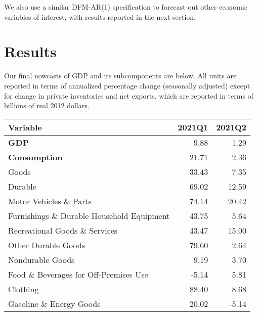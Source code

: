 \documentclass[11pt, letterpaper]{article}\usepackage[]{graphicx}\usepackage[]{color}
\begin{document}
We also use a similar DFM-AR(1) specification to forecast out other economic variables of interest, with results reported in the next section.


\section{Results}
Our final nowcasts of GDP and its subcomponents are below. All units are reported in terms of annualized percentage change (seasonally adjusted) except for change in private inventories and net exports, which are reported in terms of billions of real 2012 dollars.
\begin{table}[H]
\centering
\begingroup\fontsize{10pt}{12pt}\selectfont
\begin{tabular}{lrr}
  \hline
Variable & 2021Q1 & 2021Q2 \\ 
  \hline
\hspace{0mm} \textbf{GDP} & 9.88 & 1.29 \\ 
  \hspace{0mm} \textbf{Consumption} & 21.71 & 2.36 \\ 
  \hspace{8mm}  Goods & 33.43 & 7.35 \\ 
  \hspace{16mm}  Durable & 69.02 & 12.59 \\ 
  \hspace{24mm}  Motor Vehicles \& Parts & 74.14 & 20.42 \\ 
  \hspace{24mm}  Furnishings \& Durable Household Equipment & 43.75 & 5.64 \\ 
  \hspace{24mm}  Recreational Goods \& Services & 43.47 & 15.00 \\ 
  \hspace{24mm}  Other Durable Goods & 79.60 & 2.64 \\ 
  \hspace{16mm}  Nondurable Goods & 9.19 & 3.70 \\ 
  \hspace{24mm}  Food \& Beverages for Off-Premises Use & -5.14 & 5.81 \\ 
  \hspace{24mm}  Clothing & 88.40 & 8.68 \\ 
  \hspace{24mm}  Gasoline \& Energy Goods & 20.02 & -5.14 \\ 

\end{tabular}
\end{table}
\end{document}
